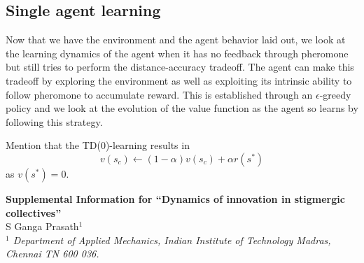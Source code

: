 \documentclass[%
reprint,
superscriptaddress,
floatfix,
amsmath,
amssymb,
aps,
notitlepage
]{revtex4-1}
\begin{document}
\subsection*{Single agent learning}
Now that we have the environment and the agent behavior laid out, we look at the learning dynamics of the agent
when it has no feedback through pheromone but still tries to perform the distance-accuracy tradeoff. The agent can
make this tradeoff by exploring the environment as well as exploiting its intrinsic ability to follow pheromone to
accumulate reward. This is established through an $\epsilon$-greedy policy and we look at the evolution of the value
function as the agent so learns by following this strategy.

Mention that the TD(0)-learning results in
\[
    v(s_c) \leftarrow (1-\alpha) v(s_c) + \alpha r(s^*)
\]
as $v(s^*) = 0$.

\large
\widetext
\clearpage
\onecolumngrid
\begin{center}
\textbf{\large Supplemental Information for ``Dynamics of innovation in stigmergic collectives''}\\[.2cm]
S  Ganga  Prasath$^{1}$\\[.1cm]
{\small \itshape ${}^1$ Department of Applied Mechanics, Indian Institute of Technology Madras, Chennai TN 600 036.
}
\end{center}
\setcounter{equation}{0}
\setcounter{figure}{0}
\setcounter{table}{0}
\setcounter{page}{1}
\makeatletter
\linespread{1.5}

\renewcommand{\thetable}{S\arabic{table}}%
\renewcommand{\thesection}{S\arabic{section}}
\renewcommand{\theequation}{S\arabic{equation}}
\renewcommand{\thefigure}{S\arabic{figure}}
\renewcommand{\thesubsection}{\roman{subsection}{}}
\end{document}
